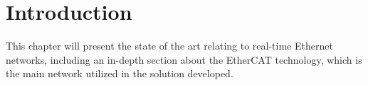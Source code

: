 \section{Introduction} \label{sec:sota_intro}

This chapter will present the state of the art relating to real-time Ethernet networks, including an in-depth section about the EtherCAT technology, which is the main network utilized in the solution developed.
